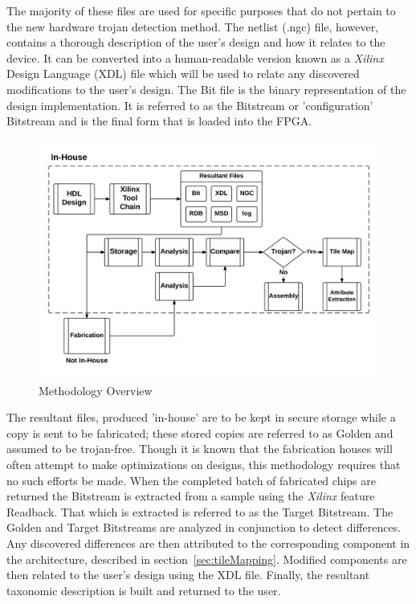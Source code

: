 \documentclass[journal, hidelinks]{IEEEtran}
\begin{document}
The majority of these files are used for specific purposes that do not pertain to the new hardware trojan detection method.
The netlist (.ngc) file, however, contains a thorough description of the user's design and how it relates to the device.
It can be converted into a human-readable version known as a \textit{Xilinx} Design Language (XDL) file which will be used to relate any discovered modifications to the user's design.
The Bit file is the binary representation of the design implementation.
It is referred to as the Bitstream or 'configuration' Bitstream and is the final form that is loaded into the FPGA.
\begin{figure}
	\centering
	\includegraphics[width=1\linewidth]{Figures/methodologyOverview}
	\caption[Methodology Overview]{Methodology Overview}
	\label{fig:methodologyOverview}
\end{figure}
The resultant files, produced 'in-house' are to be kept in secure storage while a copy is sent to be fabricated; these stored copies are referred to as Golden and assumed to be trojan-free.
Though it is known that the fabrication houses will often attempt to make optimizations on designs, this methodology requires that no such efforts be made.
When the completed batch of fabricated chips are returned the Bitstream is extracted from a sample using the \textit{Xilinx} feature Readback. 
That which is extracted is referred to as the Target Bitstream.
The Golden and Target Bitstreams are analyzed in conjunction to detect differences.
Any discovered differences are then attributed to the corresponding component in the architecture, described in section~\ref{sec:tileMapping}.
Modified components are then related to the user's design using the XDL file.
Finally, the resultant taxonomic description is built and returned to the user.
\end{document}
